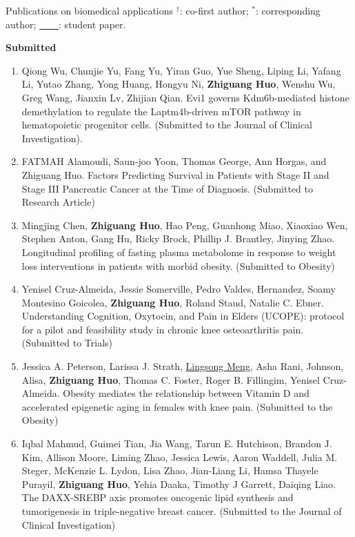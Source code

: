 \documentclass{resume} %
\begin{document}
\begin{rSection}{Publications on biomedical applications}
$^\dagger$: co-first author; $^*$: corresponding author; \underline{\mbox{ }\mbox{ }\mbox{ }\mbox{ }}: student paper.


\textbf{Submitted}
\begin{enumerate}[noitemsep,topsep=0pt]



\item 
Qiong Wu, Chunjie Yu, Fang Yu, Yiran Guo, Yue Sheng, Liping Li, Yafang Li, Yutao Zhang, Yong Huang, Hongyu Ni, {\bf Zhiguang Huo}, Wenshu Wu, Greg Wang, Jianxin Lv, Zhijian Qian.
Evi1 governs Kdm6b-mediated histone demethylation to regulate the Laptm4b-driven mTOR pathway in hematopoietic progenitor cells.
(Submitted to the Journal of Clinical Investigation).


\item 
FATMAH Alamoudi, Saun-joo Yoon, Thomas George, Ann Horgas, and Zhiguang Huo.
Factors Predicting Survival in Patients with Stage II and Stage III Pancreatic Cancer at the Time of Diagnosis.
(Submitted to Research Article)


\item 
Mingjing Chen, {\bf Zhiguang Huo}, Hao Peng, Guanhong Miao, Xiaoxiao Wen, Stephen Anton, Gang Hu, Ricky Brock, Phillip J. Brantley, Jinying Zhao.
Longitudinal profiling of fasting plasma metabolome in response to weight loss interventions in patients with morbid obesity.
(Submitted to Obesity)





\item 
Yenisel Cruz-Almeida, Jessie Somerville, Pedro Valdes, Hernandez, Soamy Montesino Goicolea, {\bf Zhiguang Huo}, Roland Staud, Natalie C. Ebner.
Understanding Cognition, Oxytocin, and Pain in Elders (UCOPE): protocol for a pilot and feasibility study in chronic knee osteoarthritis pain. 
(Submitted to Trials)





\item 
Jessica A. Peterson, Larissa J. Strath,  \underline{Lingsong Meng}, Asha Rani, Johnson, Alisa,  {\bf Zhiguang Huo}, Thomas C. Foster, Roger B. Fillingim, Yenisel Cruz-Almeida. 
Obesity mediates the relationship between Vitamin D and accelerated epigenetic aging in females with knee pain.
(Submitted to the Obesity)

\item
Iqbal Mahmud, Guimei Tian, Jia Wang, Tarun E. Hutchison, Brandon J. Kim, Allison Moore, Liming Zhao, Jessica Lewis, Aaron Waddell, Julia M. Steger, McKenzie L. Lydon, Lisa Zhao, Jian-Liang Li, Hamsa Thayele Purayil, {\bf Zhiguang Huo}, Yehia Daaka, Timothy J Garrett, Daiqing Liao.
The DAXX-SREBP axis promotes oncogenic lipid synthesis and tumorigenesis in triple-negative breast cancer.
(Submitted to the Journal of Clinical Investigation)



\end{enumerate}
\end{rSection}
\end{document}
